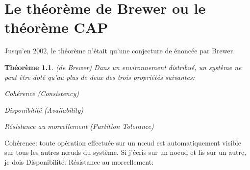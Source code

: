 \chapter{Le théorème de \textsf{Brewer} ou le théorème \textsf{CAP}}\label{cap}
Jusqu'en $2002$, le théorème n'était qu'une conjecture de énoncée par \textsf{Brewer}. 
\newtheorem{theorem}{Théorème}[section]
\begin{theorem}
\emph{(de Brewer)}
  Dans un environnement distribué, un système ne peut être doté qu'au plus de deux des trois propriétés suivantes:
\begin{dinglist}{70}
  \item Cohérence (\textsf{C}onsistency)
  \item Disponibilité (\textsf{A}vailability)
  \item Résistance au morcellement (\textsf{P}artition Tolerance)
\end{dinglist}
\end{theorem}
\noindent
\textsf{Cohérence: } toute opération effectuée sur un nœud est automatiquement visible sur tous les autres nœuds du système. Si j'écris sur un noeud et lis sur un autre, je dois    
\textsf{Disponibilité: }
\textsf{Résistance au morcellement: }
\newpage
